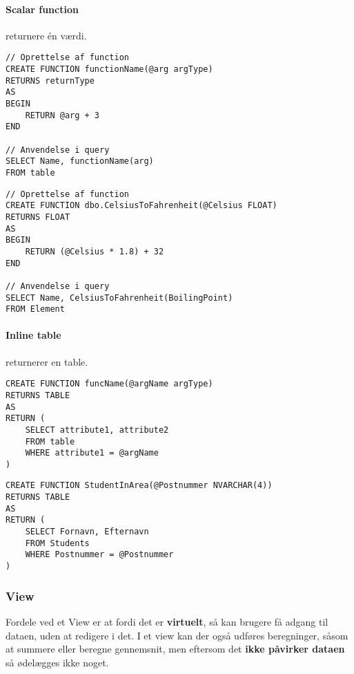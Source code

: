 \paragraph{Scalar function} returnere én værdi.

\begin{lstlisting}[caption=Generisk eksempel på scaler function.]
// Oprettelse af function
CREATE FUNCTION functionName(@arg argType)
RETURNS returnType
AS
BEGIN
	RETURN @arg + 3	
END

// Anvendelse i query
SELECT Name, functionName(arg)
FROM table
\end{lstlisting}

\begin{lstlisting}[caption=Konkret eksempel på scaler function.]
// Oprettelse af function
CREATE FUNCTION dbo.CelsiusToFahrenheit(@Celsius FLOAT)
RETURNS FLOAT
AS
BEGIN
	RETURN (@Celsius * 1.8) + 32	
END

// Anvendelse i query
SELECT Name, CelsiusToFahrenheit(BoilingPoint)
FROM Element
\end{lstlisting}

\paragraph{Inline table} returnerer en table.

\begin{lstlisting}[caption=Generisk eksempel på inline table.]
CREATE FUNCTION funcName(@argName argType)
RETURNS TABLE
AS
RETURN (
	SELECT attribute1, attribute2
	FROM table
	WHERE attribute1 = @argName
)
\end{lstlisting}

\begin{lstlisting}[caption=Konkret eksempel på inline table.]
CREATE FUNCTION StudentInArea(@Postnummer NVARCHAR(4))
RETURNS TABLE
AS
RETURN (
	SELECT Fornavn, Efternavn
	FROM Students
	WHERE Postnummer = @Postnummer
)
\end{lstlisting}

\subsubsection{View}
 Fordele ved et View er at fordi det er \textbf{virtuelt}, så kan brugere få adgang til dataen, uden at redigere i det. I et view kan der også udføres beregninger, såsom at summere eller beregne gennemsnit, men eftersom det \textbf{ikke påvirker dataen} så ødelægges ikke noget.

